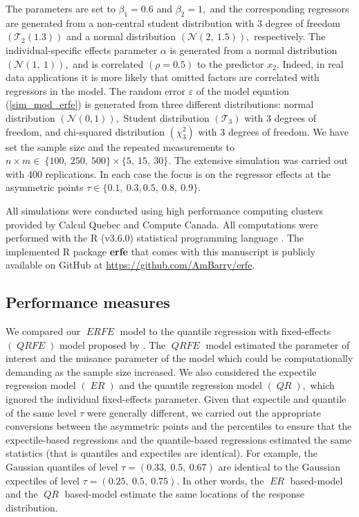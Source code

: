 \documentclass[15pt,a4paper]{article}
\DeclareMathOperator{\ERFE}{\textit{ERFE}}
\DeclareMathOperator{\QRFE}{\textit{QRFE}}
\DeclareMathOperator{\ER}{\textit{ER}}
\DeclareMathOperator{\QR}{\textit{QR}}
\begin{document}
The parameters are set to $\beta_1=0.6$ and $\beta_2=1,$ and the corresponding regressors are generated from a non-central student distribution with 3 degree of freedom $(\mathcal{T}_2(1.3))$ and a normal distribution \((\mathcal{N}(2,\ 1.5)),\) respectively. The individual-specific effects parameter \(\alpha\) is generated from a normal distribution \((\mathcal{N}(1,\ 1)),\) and is correlated $(\rho=0.5)$ to the predictor $x_2.$ Indeed, in real data applications it is more likely that omitted factors are correlated with regressors in the model. The random error \(\varepsilon\) of the model equation (\ref{sim_mod_erfe}) is generated from three different distributions: normal distribution \((\mathcal{N}(0,1)),\) Student distribution $(\mathcal{T}_3)$ with 3 degrees of freedom, and chi-squared distribution \((\chi^2_3)\) with \(3\) degrees of freedom. We have set the sample size and the repeated measurements to \(n\times m\in \ \lbrace 100,\ 250,\ 500 \rbrace \times \lbrace 5,\ 15,\ 30 \rbrace.\)  The extensive simulation was carried out with 400 replications. In each case the focus is on the regressor effects at the asymmetric points $\tau\in\lbrace 0.1, \ 0.3, 0.5, \ 0.8, \ 0.9 \rbrace.$

All simulations were conducted using high performance computing clusters provided by Calcul Quebec and Compute Canada. All computations were performed with the R (v3.6.0) statistical programming language \citet{rcran}. The implemented R package \textbf{erfe} that comes with this manuscript is publicly available on GitHub at \url{https://github.com/AmBarry/erfe}.


\subsection{Performance measures}
We compared our $\ERFE$ model to the quantile regression with fixed-effects $(\QRFE)$ model proposed by \citet{koenker_quantile_2004}. The $\QRFE$ model estimated the parameter of interest and the nuisance parameter of the model which could be computationally demanding as the sample size increased. We also considered the expectile regression model $(\ER)$ and the quantile regression model $(\QR),$ which ignored the individual fixed-effects parameter. Given that expectile and quantile of the same level $\tau$ were generally different, we carried out the appropriate conversions between the asymmetric points and the percentiles to ensure that the expectile-based regressions and the quantile-based regressions estimated the same statistics (that is quantiles and expectiles are identical). For example, the Gaussian quantiles of level \(\tau=(0.33, \ 0.5, \ 0.67)\) are identical to the Gaussian expectiles of level \(\tau=(0.25,\ 0.5,\ 0.75).\)  In other words, the $\ER$ based-model and the $\QR$ based-model estimate the same locations of the response distribution. 
\end{document}
